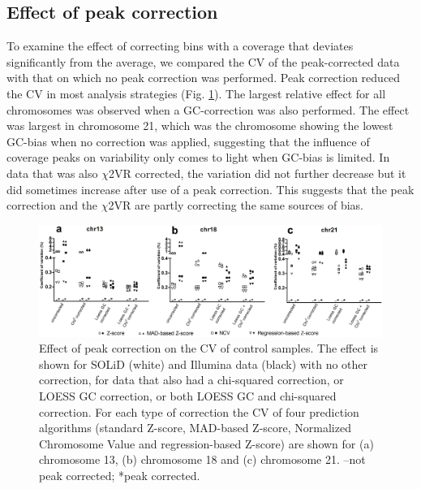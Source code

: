 \subsection{Effect of peak correction}
To examine the effect of correcting bins with a coverage that deviates significantly from the average, we compared the CV of the peak-corrected data with that on which no peak correction was performed. 
Peak correction reduced the CV in most analysis strategies (Fig. \ref{fig:Algorithms_NIPT_Fig2}). 
The largest relative effect for all chromosomes was observed when a GC-correction was also performed. 
The effect was largest in chromosome 21, which was the chromosome showing the lowest GC-bias when no correction was applied, suggesting that the influence of coverage peaks on variability only comes to light when GC-bias is limited. 
In data that was also $\chi$2VR corrected, the variation did not further decrease but it did sometimes increase after use of a peak correction. 
This suggests that the peak correction and the $\chi$2VR are partly correcting the same sources of bias.

\begin{figure}
	\includegraphics[width=1.0\linewidth]{img/Algorithms_NIPT_Fig2}
	\caption[Effect of peak correction]{Effect of peak correction on the CV of control samples. The effect is shown for SOLiD (white) and Illumina data (black) with no other correction, for data that also had a chi-squared correction, or LOESS GC correction, or both LOESS GC and chi-squared correction. For each type of correction the CV of four prediction algorithms (standard Z-score, MAD-based Z-score, Normalized Chromosome Value and regression-based Z-score) are shown for (a) chromosome 13, (b) chromosome 18 and (c) chromosome 21. –not peak corrected; *peak corrected.}
	\label{fig:Algorithms_NIPT_Fig2}
\end{figure}

